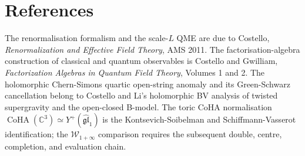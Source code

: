 \documentclass[11pt]{article}
\theoremstyle{definition}
\theoremstyle{remark}
\providecommand{\C}{\mathbb{C}}
\providecommand{\fgl}{\mathfrak{gl}}
\providecommand{\CoHA}{\operatorname{CoHA}}
\providecommand{\Yp}{Y^{+}}
\providecommand{\Winf}{\mathcal{W}_{1+\infty}}
\begin{document}
\section{References}
\label{sec:references}

The renormalisation formalism and the scale-$L$ QME are due to
Costello, \emph{Renormalization and Effective Field Theory}, AMS 2011.
The factorisation-algebra construction of classical and quantum
observables is Costello and Gwilliam, \emph{Factorization Algebras in
Quantum Field Theory}, Volumes 1 and 2.  The holomorphic Chern-Simons
quartic open-string anomaly and its Green-Schwarz cancellation belong
to Costello and Li's holomorphic BV analysis of twisted supergravity
and the open-closed B-model.  The toric CoHA normalisation
$\CoHA(\C^3)\simeq\Yp(\widehat{\fgl}_1)$ is the Kontsevich-Soibelman
and Schiffmann-Vasserot identification; the $\Winf$ comparison requires
the subsequent double, centre, completion, and evaluation chain.
\end{document}
